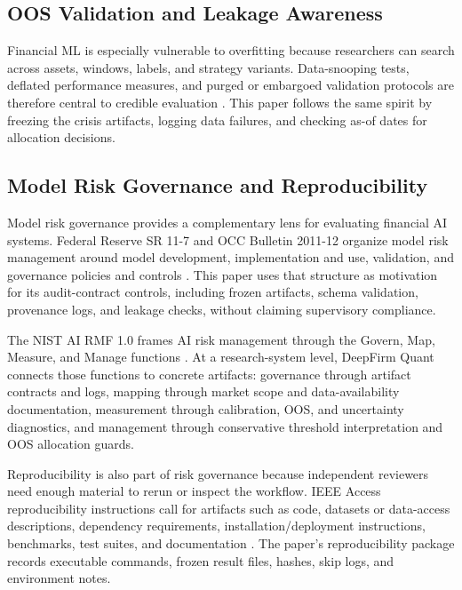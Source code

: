 \documentclass{ieeeaccess}
\begin{document}
\subsection{OOS Validation and Leakage Awareness}
Financial ML is especially vulnerable to overfitting because researchers can search across assets, windows, labels, and strategy variants. Data-snooping tests, deflated performance measures, and purged or embargoed validation protocols are therefore central to credible evaluation \cite{White2000RealityCheck,BaileyEtAl2016BacktestOverfitting,BaileyLopezDePrado2014DeflatedSharpe,LopezDePrado2018FinancialML}. This paper follows the same spirit by freezing the crisis artifacts, logging data failures, and checking as-of dates for allocation decisions.

\subsection{Model Risk Governance and Reproducibility}
Model risk governance provides a complementary lens for evaluating financial AI systems. Federal Reserve SR 11-7 and OCC Bulletin 2011-12 organize model risk management around model development, implementation and use, validation, and governance policies and controls \cite{FederalReserveOCC2011SR117ModelRisk}. This paper uses that structure as motivation for its audit-contract controls, including frozen artifacts, schema validation, provenance logs, and leakage checks, without claiming supervisory compliance.

The NIST AI RMF 1.0 frames AI risk management through the Govern, Map, Measure, and Manage functions \cite{Tabassi2023NISTAIRMF}. At a research-system level, DeepFirm Quant connects those functions to concrete artifacts: governance through artifact contracts and logs, mapping through market scope and data-availability documentation, measurement through calibration, OOS, and uncertainty diagnostics, and management through conservative threshold interpretation and OOS allocation guards.

Reproducibility is also part of risk governance because independent reviewers need enough material to rerun or inspect the workflow. IEEE Access reproducibility instructions call for artifacts such as code, datasets or data-access descriptions, dependency requirements, installation/deployment instructions, benchmarks, test suites, and documentation \cite{IEEEAccessReproducibility2026}. The paper's reproducibility package records executable commands, frozen result files, hashes, skip logs, and environment notes.
\end{document}

